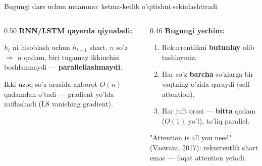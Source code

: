 \documentclass[aspectratio=169,11pt]{beamer}
\begin{document}
\begin{frame}{Bugungi dars uchun muammo: ketma-ketlik o'qitishni sekinlashtiradi}
  \begin{columns}[T]
    \begin{column}{0.50\textwidth}
      \textbf{RNN/LSTM qayerda qiynaladi:}\\[3pt]
      \small
      \begin{tcolorbox}[warnbox,title={Ketma-ket hisob},top=2pt,bottom=2pt]
        \footnotesize
        $h_t$ ni hisoblash uchun $h_{t-1}$ shart. $n$ so'z $\Rightarrow$ $n$
        qadam, biri tugamay ikkinchisi boshlanmaydi --- \textbf{parallellashmaydi}.
      \end{tcolorbox}
      \vspace{3pt}
      \begin{tcolorbox}[warnbox,title={Uzoq bog'liqlik sust},top=2pt,bottom=2pt]
        \footnotesize
        Ikki uzoq so'z orasida axborot $O(n)$ qadamdan o'tadi --- gradient
        yo'lda zaiflashadi (L8 vanishing gradient).
      \end{tcolorbox}
    \end{column}
    \begin{column}{0.46\textwidth}
      \textbf{Bugungi yechim:}\\[4pt]
      \small
      \begin{enumerate}\setlength\itemsep{4pt}
        \item Rekurrentlikni \textbf{butunlay} olib tashlaymiz.
        \item Har so'z \textbf{barcha} so'zlarga bir vaqtning o'zida qaraydi
              (self-attention).
        \item Har juft orasi --- \textbf{bitta} qadam ($O(1)$ yo'l), to'liq
              parallel.
      \end{enumerate}
      \vspace{5pt}
      \begin{tcolorbox}[okbox,top=2pt,bottom=2pt]
        \footnotesize
        "Attention is all you need" (Vaswani, 2017): rekurrentlik shart emas ---
        faqat attention yetadi.
      \end{tcolorbox}
    \end{column}
  \end{columns}
\end{frame}

\end{document}
